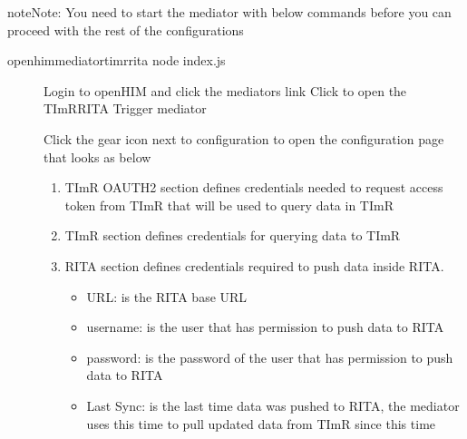 \documentclass[letterpaper,10pt,english]{sphinxmanual}
\let\sphinxpxdimen\pdfpxdimen\else\newdimen\sphinxpxdimen
\begin{document}
\begin{sphinxadmonition}{note}{Note:}
\sphinxAtStartPar
You need to start the mediator with below commands before you can proceed with the rest of the configurations
\end{sphinxadmonition}

\begin{sphinxVerbatim}[commandchars=\\\{\}]
 openhim\PYGZhy{}mediator\PYGZhy{}timr\PYGZhy{}rita
node index.js
\end{sphinxVerbatim}
\begin{description}
\item[{}] \leavevmode
\sphinxAtStartPar
Login to openHIM and click the mediators link
Click to open the TImR\sphinxhyphen{}RITA Trigger mediator

\noindent\sphinxincludegraphics[height=250\sphinxpxdimen]{{mediator-index}.png}

\sphinxAtStartPar
Click the gear icon next to configuration to open the configuration page that looks as below

\noindent{}
\begin{enumerate}
%
\item {} 
\sphinxAtStartPar
TImR OAUTH2 section defines credentials needed to request access token from TImR that will be used to query data in TImR

\item {} 
\sphinxAtStartPar
TImR section defines credentials for querying data to TImR

\item {} 
\sphinxAtStartPar
RITA section defines credentials required to push data inside RITA.
\begin{itemize}
\item {} 
\sphinxAtStartPar
URL: is the RITA base URL

\item {} 
\sphinxAtStartPar
username: is the user that has permission to push data to RITA

\item {} 
\sphinxAtStartPar
password: is the password of the user that has permission to push data to RITA

\item {} 
\sphinxAtStartPar
Last Sync: is the last time data was pushed to RITA, the mediator uses this time to pull updated data from TImR since this time


\end{itemize}
\end{enumerate}
\end{description}
\end{document}
